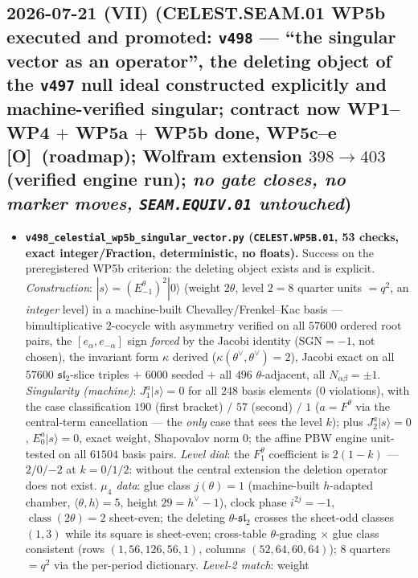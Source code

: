 \documentclass[11pt]{article}
\providecommand{\mO}{\textbf{[O]}}\providecommand{\mX}{\textbf{[X]}}
\begin{document}
\subsection*{2026-07-21 (VII) (CELEST.SEAM.01 WP5b executed and promoted: \texttt{v498} --- ``the singular vector as an operator'', the deleting object of the \texttt{v497} null ideal constructed explicitly and machine-verified singular; contract now WP1--WP4 $+$ WP5a $+$ WP5b done, WP5c--e \mO\ (roadmap); Wolfram extension $398\to403$ (verified engine run); \emph{no gate closes, no marker moves, \texttt{SEAM.EQUIV.01} untouched})}
\begin{itemize}[leftmargin=1.5em]
\item \textbf{\texttt{v498\_celestial\_wp5b\_singular\_vector.py} (\texttt{CELEST.WP5B.01}, 53 checks,
exact integer/Fraction, deterministic, no floats).} Success on the preregistered WP5b criterion: the
deleting object exists and is explicit. \emph{Construction}: $|s\rangle=(E^\theta_{-1})^2|0\rangle$
(weight $2\theta$, level $2=8$ quarter units $=q^2$, an \emph{integer} level) in a machine-built
Chevalley/Frenkel--Kac basis --- bimultiplicative $2$-cocycle with asymmetry verified on all $57600$
ordered root pairs, the $[e_\alpha,e_{-\alpha}]$ sign \emph{forced} by the Jacobi identity
($\mathrm{SGN}=-1$, not chosen), the invariant form $\kappa$ derived
($\kappa(\theta^\vee,\theta^\vee)=2$), Jacobi exact on all $57600$ $\mathfrak{sl}_2$-slice triples $+$
$6000$ seeded $+$ all $496$ $\theta$-adjacent, all $N_{\alpha\beta}=\pm1$. \emph{Singularity
(machine)}: $J^a_1|s\rangle=0$ for all $248$ basis elements ($0$ violations), with the case
classification $190$ (first bracket) $/$ $57$ (second) $/$ $1$ ($a=F^\theta$ via the central-term
cancellation --- the \emph{only} case that sees the level $k$); plus $J^a_2|s\rangle=0$,
$E^a_0|s\rangle=0$, exact weight, Shapovalov norm $0$; the affine PBW engine unit-tested on all $61504$
basis pairs. \emph{Level dial}: the $F^\theta_1$ coefficient is $2(1{-}k)$ --- $2/0/{-2}$ at $k=0/1/2$:
without the central extension the deletion operator does not exist. \emph{$\mu_4$ data}: glue class
$j(\theta)=1$ (machine-built $h$-adapted chamber, $\langle\theta,h\rangle=5$, height $29=h^\vee{-}1$),
clock phase $i^{2j}=-1$, $\operatorname{class}(2\theta)=2$ sheet-even; the deleting
$\theta$-$\mathfrak{sl}_2$ crosses the sheet-odd classes $(1,3)$ while its square is sheet-even;
cross-table $\theta$-grading $\times$ glue class consistent (rows $(1,56,126,56,1)$, columns
$(52,64,60,64)$); $8$ quarters $=q^2$ via the per-period dictionary. \emph{Level-2 match}: weight

\end{itemize}
\end{document}
